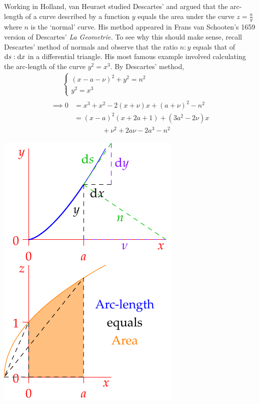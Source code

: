 \begin{minipage}[t]{0.64\linewidth}\vspace{0pt}
 Working in Holland, van Heuraet studied Descartes' and argued that the arc-length of a curve described by a function $y$ equals the area under the curve $z=\frac ny$ where $n$ is the `normal' curve. His method appeared in Frans van Schooten's 1659 version of Descartes' \emph{La Geometrie.} To see why this should make sense, recall Descartes' method of normals and observe that the ratio $n:y$ equals that of ${\mathrm{d} s}:{\mathrm{d} x}$ in a differential triangle.\smallbreak
His most famous example involved calculating the arc-length of the curve $y^2=x^3$. By Descartes' method,
\begin{gather*}
\qquad\begin{cases}
(x-a-\nu)^2+y^2=n^2\\
y^2=x^3
\end{cases}\\
\begin{aligned}
\implies 0&= x^3+x^2-2(x+\nu)x+(a+\nu)^2-n^2\\
&=(x-a)^2(x+2a+1)+(3a^2-2\nu)x\\
&\qquad\qquad +\nu^2+2a\nu-2a^3-n^2
\end{aligned}
\end{gather*}
\end{minipage}\hfill\begin{minipage}[t]{0.35\linewidth}\vspace{-4pt}
\flushright\includegraphics{calc-gregory}
\end{minipage}\medbreak

